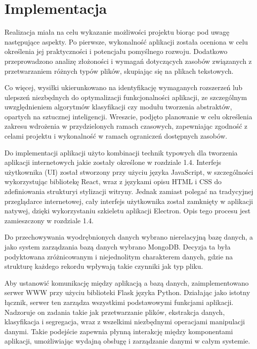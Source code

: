 \documentclass[12pt,a4paper,twoside]{article}
\begin{document}
\section{Implementacja}
Realizacja miała na celu wykazanie możliwości projektu biorąc pod uwagę następujące aspekty. 
Po pierwsze, wykonalność aplikacji została oceniona w celu określenia jej praktyczności i potencjału pomyślnego rozwoju.
Dodatkowo przeprowadzono analizę złożoności i wymagań dotyczących zasobów związanych z przetwarzaniem różnych typów plików, skupiając się na plikach tekstowych.\par
Co więcej, wysiłki ukierunkowano na identyfikację wymaganych rozszerzeń lub ulepszeń niezbędnych do optymalizacji funkcjonalności aplikacji, ze szczególnym uwzględnieniem algorytmów klasyfikacji czy modułu tworzenia abstraktów, opartych na sztucznej inteligencji.
Wreszcie, podjęto planowanie w celu określenia zakresu wdrożenia w przydzielonych ramach czasowych, zapewniając zgodność z celami projektu i wykonalność w ramach ograniczeń dostępnych zasobów.\par
Do implementacji aplikacji użyto kombinacji technik typowych dla tworzenia aplikacji internetowych jakie zostały określone w rozdziale 1.4. Interfejs użytkownika (UI) został stworzony przy użyciu języka JavaScript, w szczególności wykorzystując bibliotekę React, wraz z językami opisu HTML i CSS do zdefiniowania struktury\break i stylizacji witryny. Jednak zamiast polegać na tradycyjnej przeglądarce internetowej, cały interfejs użytkownika został zamknięty w aplikacji natywej, dzięki wykorzystaniu szkieletu aplikacji Electron. Opis tego procesu jest zamieszczony w rozdziale 1.4.\par
Do przechowywania wyodrębnionych danych wybrano nierelacyjną bazę danych, a jako system zarządzania bazą danych wybrano MongoDB. Decyzja ta była podyktowana zróżnicowanym i niejednolitym charakterem danych, gdzie na strukturę każdego rekordu wpływają takie czynniki jak typ pliku.\par
Aby ustanowić komunikację między aplikacją a bazą danych, zaimplementowano serwer WWW przy użyciu biblioteki Flask języka Python. Działając jako istotny łącznik, serwer ten zarządza wszystkimi podstawowymi funkcjami aplikacji. Nadzoruje on zadania takie jak przetwarzanie plików, ekstrakcja danych, klasyfikacja i segregacja, wraz z wszelkimi niezbędnymi operacjami manipulacji danymi. Takie podejście zapewnia płynną interakcję między komponentami aplikacji, umożliwiając wydajną obsługę i zarządzanie danymi w całym systemie.\par
\end{document}
